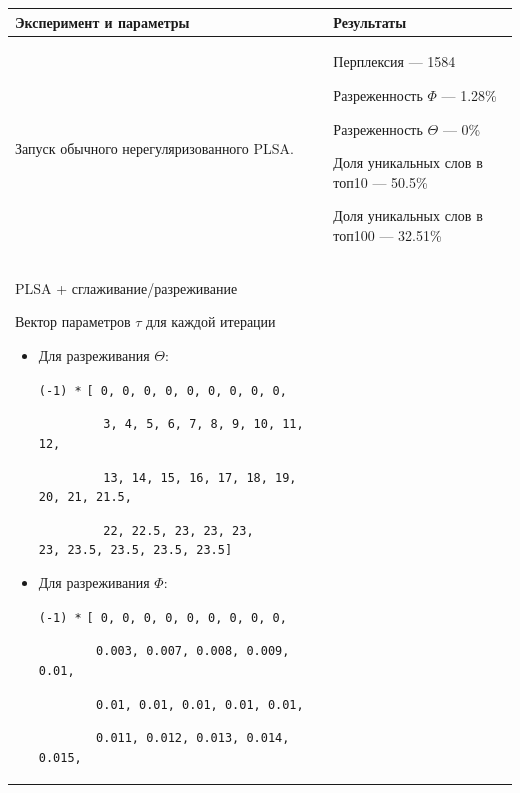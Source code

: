 \noindent
\begin{tabular}[t]{|p{29em}|p{12em}|}
\hline
\vspace{2pt} \textbf{Эксперимент и параметры} \vspace{4pt} &
\vspace{2pt} \textbf{Результаты} \vspace{4pt} \\

\hline
\vspace{4pt}

Запуск обычного нерегуляризованного PLSA. & 
\vspace{4pt}

Перплексия --- 1584

Разреженность $\Phi$ --- 1.28\%

Разреженность $\Theta$ --- 0\%

Доля уникальных слов в топ10 --- 50.5\%

Доля уникальных слов в топ100 --- 32.51\%

\\
\hline
\vspace{4pt}

PLSA + сглаживание/разреживание 

Вектор параметров $\tau$ для каждой итерации

\begin{itemize}
	\item Для разреживания $\Theta$: 
	
	\verb|(-1) *| \verb|[ 0, 0, 0, 0, 0, 0, 0, 0, 0,|
	                 
	                 \verb|         3, 4, 5, 6, 7, 8, 9, 10, 11, 12,|
	                 
	                 \verb|         13, 14, 15, 16, 17, 18, 19, 20, 21, 21.5,|
	                 
	                 \verb|         22, 22.5, 23, 23, 23,|
	                 \verb|         23, 23.5, 23.5, 23.5, 23.5]|
	                 
	\item Для разреживания $\Phi$: 
	
	\verb|(-1) *| \verb|[ 0, 0, 0, 0, 0, 0, 0, 0, 0,| 
				  
	                 \verb|        0.003, 0.007, 0.008, 0.009, 0.01, |
	                 
	                 \verb|        0.01, 0.01, 0.01, 0.01, 0.01, |
	                 
	                 \verb|        0.011, 0.012, 0.013, 0.014, 0.015,| 
	                 

\end{itemize}
\end{tabular}
